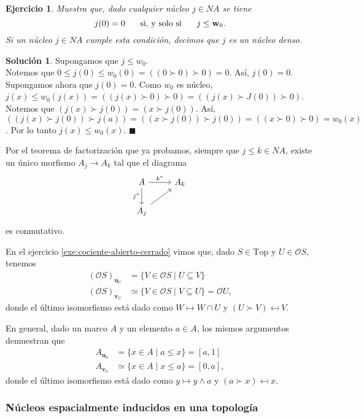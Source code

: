 \documentclass[12pt,letterpaper,titlepage]{article}
\newcommand{\xqed}[1]{%
  \leavevmode\unskip\penalty9999 \hbox{}\nobreak\hfill
  \quad\hbox{\ensuremath{#1}}}
\newtheorem{exe}{Ejercicio}
\theoremstyle{definition}
\newtheorem*{soltemp}{Solución}
\newenvironment{sol}[1]{%
    \begin{soltemp}#1}{%
    \xqed{\blacksquare}\end{soltemp}%
}
\renewcommand\inf{\wedge}
\renewcommand\cal[1]{\mathcal{#1}}
\newcommand\ssi{\hspace{5mm}\text{ si, y solo si }\hspace{5mm}}
\newcommand\unuc[1]{\mathbf u_{#1}}
\newcommand\vnuc[1]{\mathbf v_{#1}}
\newcommand\wnuc[1]{\mathbf w_{#1}}
\newcommand\<{\langle}
\renewcommand\>{\rangle}
\newcommand{\Top}{\mathrm{Top}}
\begin{document}
\begin{exe}%
    \label{exe:nucleos-densos}
  Muestra que, dado cualquier núcleo $j\in NA$ se tiene
  \[
    j(0)=0 \ssi j\leq \wnuc 0
  .\]
  Si un núcleo $j\in NA$ cumple esta condición,
  decimos que $j$ es un núcleo denso.
\end{exe}

\begin{sol}
    Supongamos que $j\leq w_0$.\\
    Notemos que $0\leq j(0)\leq w_0(0)=((0\succ 0)\succ 0)=0$. Así, $j(0)=0$.\\
    \noindent
    Supongamos ahora que $j(0)=0$. Como $w_0$ es núcleo, $j(x)\leq w_0(j(x))=((j(x)\succ 0)\succ 0)=((j(x)\succ J(0))\succ 0)$. Notemos que $(j(x)\succ j(0))=(x\succ j(0))$. Así, $((j(x)\succ j(0))\succ j(a))=((x\succ j(0))\succ j(0))=((x\succ 0)\succ 0)=w_0(x)$. Por lo tanto $j(x)\leq w_0(x).$
\end{sol}

Por el teorema de factorización que ya probamos, siempre que
$j\leq k\in NA$, existe un único morfismo $A_j\to A_k$ tal que el
diagrama
\[
    \begin{tikzcd}
      A \ar[r,"k^*"] \ar[d,"j^*"'] & A_k \\
      A_j \ar[ur]
    \end{tikzcd}
\]
es conmutativo.

En el ejercicio \ref{exe:cociente-abierto-cerrado}
vimos que, dado $S\in\Top$ y $U\in\cal OS$,
tenemos
\begin{align*}
    (\cal OS)_{\unuc U}
    &= \{V\in\cal OS\mid U\subseteq V\} \\
    (\cal OS)_{\vnuc U}
    &\simeq \{V\in\cal OS\mid V\subseteq U\}
    = \cal OU,
\end{align*}
donde el último isomorfismo está dado como $W\mapsto W\cap U$
y $(U\succ V)\mapsfrom V$.

En general, dado un marco $A$ y un elemento $a\in A$,
los mismos argumentos demuestran que
\begin{align*}
    A_{\unuc a}
    &= \{x\in A\mid a\leq x\} = [a,1]\\
    A_{\vnuc a}
    &\simeq \{x\in A\mid x\leq a\} = [0,a],
\end{align*}
donde el último isomorfismo está dado como $y\mapsto y\inf a$
y $(a\succ x)\mapsfrom x$.

\subsubsection{Núcleos espacialmente inducidos en una topología}
\end{document}
